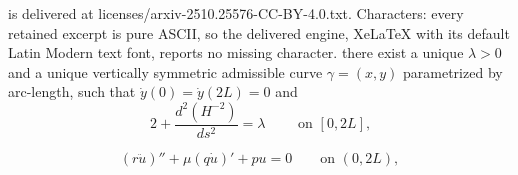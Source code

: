 \documentclass[10pt,a4paper]{amsart}
\begin{document}
is delivered at licenses/arxiv-2510.25576-CC-BY-4.0.txt. Characters: every retained excerpt is pure ASCII, so the delivered engine, XeLaTeX with its default Latin Modern text font, reports no missing character.
		there exist a unique $\lambda>0$ and a unique vertically symmetric admissible curve $\gamma=(x,y)$ parametrized by arc-length, such that $\dot y(0)=\dot y(2L)=0$ and        \begin{equation}\label{equazionepuntocriticoinlemma}
			2+\frac{d^2(H^{-2})}{ds^2}=\lambda\qquad\text{ on $[0,2L]$,}
		\end{equation} 

\begin{equation}\label{onlyequation}
\left(r \ddot u\right)''+\mu \left(q \dot u\right)'+pu=0\qquad\text{on }(0,2L),
\end{equation}
\end{document}
